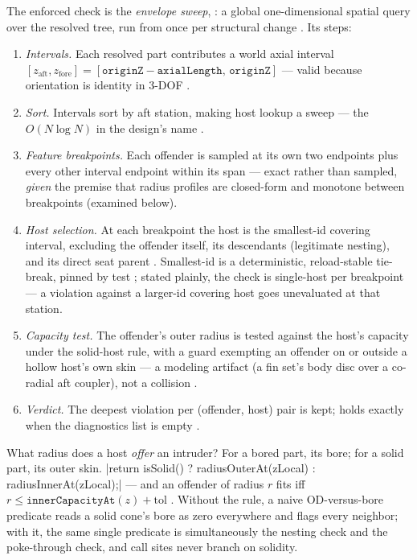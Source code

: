 The enforced check is the \emph{envelope sweep}, 
: a global one-dimensional spatial query over the
resolved tree, run from  once per structural change
. Its steps:

\begin{enumerate}
\item \emph{Intervals.} Each resolved part contributes a world axial interval
  $[z_{\mathrm{aft}}, z_{\mathrm{fore}}] = [\mathtt{originZ} - \mathtt{axialLength},\,
  \mathtt{originZ}]$ --- valid because orientation is identity in 3-DOF
  .
\item \emph{Sort.} Intervals sort by aft station, making host lookup a sweep --- the
  $O(N \log N)$ in the design's name .
\item \emph{Feature breakpoints.} Each offender is sampled at its own two endpoints plus
  every other interval endpoint within its span  ---
  exact rather than sampled, \emph{given} the premise that radius profiles are
  closed-form and monotone between breakpoints (examined below).
\item \emph{Host selection.} At each breakpoint the host is the smallest-id covering
  interval, excluding the offender itself, its descendants (legitimate nesting), and its
  direct seat parent . Smallest-id is a
  deterministic, reload-stable tie-break, pinned by test
  ; stated plainly, the check is
  single-host per breakpoint --- a violation against a larger-id covering host goes
  unevaluated at that station.
\item \emph{Capacity test.} The offender's outer radius is tested against the host's
  capacity under the solid-host rule, with a guard exempting an offender on or outside a
  hollow host's own skin --- a modeling artifact (a fin set's body disc over a co-radial
  aft coupler), not a collision .
\item \emph{Verdict.} The deepest violation per (offender, host) pair is kept;
   holds exactly when the diagnostics list is empty
  .
\end{enumerate}

\begin{designrule}
What radius does a host \emph{offer} an intruder? For a bored part, its bore; for a solid
part, its outer skin. \cppinline|return isSolid() ? radiusOuterAt(zLocal) : radiusInnerAt(zLocal);|
 --- and an offender of radius $r$ fits iff
$r \le \mathtt{innerCapacityAt}(z) + \mathrm{tol}$ . Without
the rule, a naive OD-versus-bore predicate reads a solid cone's bore as zero everywhere
and flags every neighbor; with it, the same single predicate is simultaneously the
nesting check and the poke-through check, and call sites never branch on solidity.
\end{designrule}

